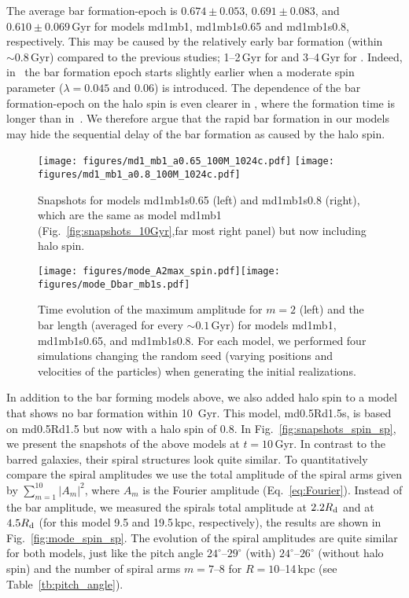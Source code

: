 The average bar formation-epoch is $0.674 \pm 0.053$,
$0.691\pm 0.083$, and $0.610\pm 0.069$\,Gyr for models md1mb1, md1mb1s0.65 and md1mb1s0.8, respectively.
This may be caused by the relatively early bar formation (within $\sim0.8$\,Gyr)
compared to the previous
studies; 1--2\,Gyr for \citet{2014ApJ...783L..18L} and 3--4\,Gyr for
\citet{2013MNRAS.434.1287S}.
Indeed, in~\citet{2014ApJ...783L..18L} the bar formation epoch starts slightly earlier when 
a moderate spin parameter ($\lambda=0.045$ and 0.06) is introduced. The
dependence of the bar formation-epoch on the halo spin is even clearer in
\citet{2013MNRAS.434.1287S}, where the formation time is longer
than in~\citet{2014ApJ...783L..18L}.
We therefore argue that the rapid bar formation in our models may hide the sequential delay
of the bar formation as caused by the halo spin.

%
\begin{figure}
\begin{center}
  \texttt{[image: figures/md1\_mb1\_a0.65\_100M\_1024c.pdf]}
  \texttt{[image: figures/md1\_mb1\_a0.8\_100M\_1024c.pdf]}\\
    \caption{Snapshots for models md1mb1s0.65 (left) and md1mb1s0.8 (right), which are the same as model md1mb1 (Fig.~\ref{fig:snapshots_10Gyr},far most right panel) but now including halo spin.}\label{fig:snapshots_spin_b}
\end{center}
\end{figure}



\begin{figure*}
\texttt{[image: figures/mode\_A2max\_spin.pdf]}\texttt{[image: figures/mode\_Dbar\_mb1s.pdf]}
\caption{Time evolution of the maximum amplitude for $m=2$ (left) and the bar length (averaged for every $\sim 0.1$\,Gyr) for models md1mb1, md1mb1s0.65, and md1mb1s0.8. For each model, we performed four simulations changing the random seed (varying positions and velocities of the particles) when generating the initial realizations.
\label{fig:A2_max_spin}}
\end{figure*}

In addition to the bar forming models above, we also added halo spin to a model that 
shows no bar formation within 10\, Gyr. This model, md0.5Rd1.5s, is based on md0.5Rd1.5
but now with a halo spin of 0.8. 
In Fig.~\ref{fig:snapshots_spin_sp}, we present the snapshots of the above models at $t=10$\,Gyr. 
In contrast to the barred galaxies, their spiral structures look quite similar. 
To quantitatively compare the spiral amplitudes we use the total amplitude of the spiral arms 
given by $\sum ^{10}_{m=1} |A_m|^2$, where $A_m$ is the Fourier amplitude (Eq.~\ref{eq:Fourier}).
Instead of the bar amplitude, we measured the spirals total amplitude at 
$2.2R_{\rm d}$ and at $4.5R_{\rm d}$ (for this model 9.5 and 19.5\,kpc, respectively), 
the results are shown in Fig.~\ref{fig:mode_spin_sp}. 
The evolution of the spiral amplitudes are quite similar for both models, 
just like the pitch angle  $24^{\circ}$--$29^{\circ}$ (with)
$24^{\circ}$--$26^{\circ}$ (without halo spin) and the number of 
spiral arms $m=7$--8 for $R=10$--14\,kpc (see Table~\ref{tb:pitch_angle}).


